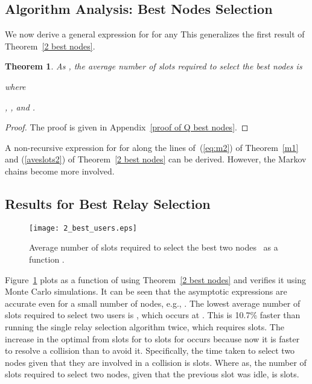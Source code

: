\documentclass[12pt,draftcls,peerreview, onecolumn]{IEEEtran}
\newtheorem{theorem}{{\bf Theorem}}
\newcommand{\eqn}[1]{(\ref{#1})}
\begin{document}
\subsection{Algorithm Analysis:  Best  Nodes Selection}
We now derive a general expression for 
for any  This generalizes the first result of Theorem~\ref{2 best
  nodes}.


\begin{theorem}
\label{Q best nodes}
As , the average number of slots
required to select the  best  nodes is

where

, , and .
\end{theorem}
\begin{proof}
The proof is given in Appendix~\ref{proof of Q best nodes}.
\end{proof}
A non-recursive expression for  for 
along the lines of~\eqn{eq:m2} of Theorem~\ref{m1} and \eqn{aveslots2}
of Theorem~\ref{2 best nodes} can be derived.  However, the Markov
chains become more involved.


\subsection{Results for  Best Relay Selection}

\begin{figure}[p]
  \centering \texttt{[image: 2\_best\_users.eps]}
\caption{Average number of slots required to select the  best two nodes~ as a function .}
\label{fig:2_best_nodes}
\end{figure}


Figure~\ref{fig:2_best_nodes} plots  as a
function of  using Theorem~\ref{2 best nodes} and verifies it
using Monte Carlo simulations. It can be seen that the asymptotic
expressions are accurate even for a small number of nodes, e.g., . The lowest average number of slots required to select two users
is , which occurs at .  This is 10.7\% faster than
running the single relay selection algorithm twice, which requires  slots. The increase in the optimal  from
 slots for  to  slots for  occurs because
now it is faster to resolve a collision than to avoid it.
Specifically, the time taken to select two nodes given that they are
involved in a collision is  slots.  Where as, the
number of slots required to select two nodes, given that the previous
slot was idle, is  slots.
\end{document}
